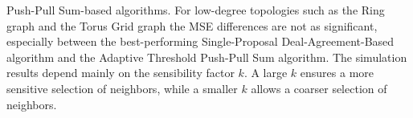 Push-Pull Sum-based algorithms. For low-degree topologies such as the Ring graph and the Torus Grid graph the MSE differences are not as significant, especially between the best-performing Single-Proposal Deal-Agreement-Based algorithm and the Adaptive Threshold Push-Pull Sum algorithm. The simulation results depend mainly on the sensibility factor $k$. A large $k$ ensures a more sensitive selection of neighbors, while a smaller $k$ allows a coarser selection of neighbors.